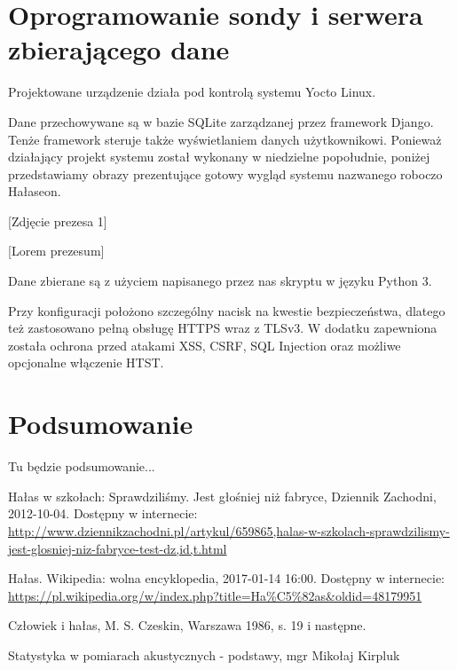 \documentclass[12pt, a4paper]{article}
\begin{document}
\section{Oprogramowanie sondy i serwera zbierającego dane}

Projektowane urządzenie działa pod kontrolą systemu Yocto Linux.

Dane przechowywane są w bazie SQLite zarządzanej przez framework Django. Tenże framework steruje także wyświetlaniem danych użytkownikowi. Ponieważ działający projekt systemu został wykonany w niedzielne popołudnie, poniżej przedstawiamy obrazy prezentujące gotowy wygląd systemu nazwanego roboczo Hałaseon.

[Zdjęcie prezesa 1]
 
[Lorem prezesum]

Dane zbierane są z użyciem napisanego przez nas skryptu w języku Python 3. 

Przy konfiguracji położono szczególny nacisk na kwestie bezpieczeństwa, dlatego też zastosowano pełną obsługę HTTPS wraz z TLSv3. W dodatku zapewniona została ochrona przed atakami XSS, CSRF, SQL Injection oraz możliwe opcjonalne włączenie HTST.

\section{Podsumowanie}

Tu będzie podsumowanie...

\begin{thebibliography}{9}

  Hałas w szkołach: Sprawdziliśmy. Jest głośniej niż fabryce, Dziennik Zachodni, 2012-10-04. Dostępny w internecie: \url{http://www.dziennikzachodni.pl/artykul/659865,halas-w-szkolach-sprawdzilismy-jest-glosniej-niz-fabryce-test-dz,id,t.html}

  Hałas. Wikipedia: wolna encyklopedia, 2017-01-14 16:00. Dostępny w internecie: \url{https://pl.wikipedia.org/w/index.php?title=Ha%C5%82as&oldid=48179951}
  
  Człowiek i hałas, M. S. Czeskin, Warszawa 1986, s. 19 i następne.
  
  Statystyka w pomiarach akustycznych - podstawy, mgr Mikołaj Kirpluk
\end{thebibliography}
\end{document}
